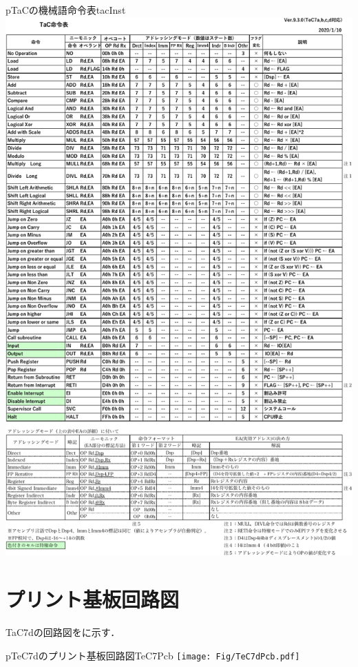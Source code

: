 \begin{myfig}{p}{TaCの機械語命令表}{tacInst}
  \includegraphics[scale=0.88,page=1]{Fig/TaCInst-crop.pdf}
\end{myfig}

\section{プリント基板回路図}
TaC7dの回路図をに示す．

\begin{myfig}{p}{TeC7dのプリント基板回路図}{TeC7Pcb}
  \texttt{[image: Fig/TeC7dPcb.pdf]}
\end{myfig}
